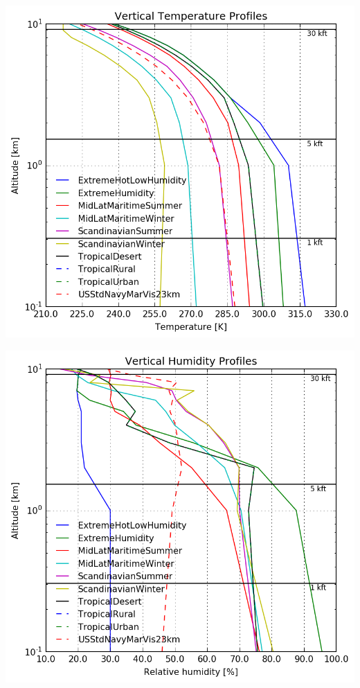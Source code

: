 \documentclass{workpackage}
\begin{document}
\begin{center}
\includegraphics{./pic/Analyse-Standard-Atmospheres_15_1.png}
\end{center}

\begin{center}
\includegraphics{./pic/Analyse-Standard-Atmospheres_15_2.png}
\end{center}
\end{document}
